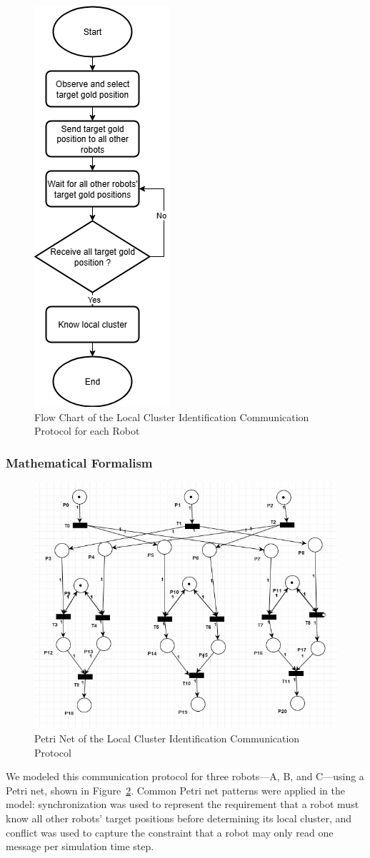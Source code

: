 \documentclass[12pt,a4paper]{article}
\begin{document}
\begin{figure}
    \centering
    \includegraphics[width=0.2\linewidth]{images/cluster_flow.png}
    \caption{Flow Chart of the Local Cluster Identification Communication Protocol for each Robot}   
    \label{fig:cluster-flow}
\end{figure}

\subsubsection{Mathematical Formalism}

\begin{figure}[htbp]
    \centering
    \includegraphics[width=0.8\linewidth]{images/cluster_petri.jpg}
    \caption{Petri Net of the Local Cluster Identification Communication Protocol}   
    \label{fig:cluster-petri}
\end{figure}

We modeled this communication protocol for three robots—A, B, and C—using a Petri net, shown in Figure~\ref{fig:cluster-petri}. Common Petri net patterns were applied in the model: synchronization was used to represent the requirement that a robot must know all other robots’ target positions before determining its local cluster, and conflict was used to capture the constraint that a robot may only read one message per simulation time step.
\end{document}
